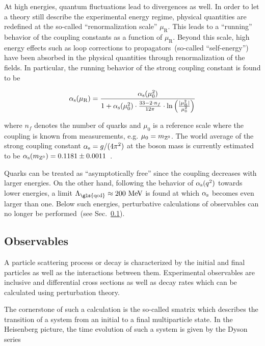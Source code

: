 
At high energies, quantum fluctuations lead to divergences as well. In order to let a theory still describe the experimental energy regime, physical quantities are redefined at the so-called ``renormalization scale'' $\mu_\mathrm{R}$. This leads to a ``running'' behavior of the coupling constants as a function of $\mu_\mathrm{R}$. Beyond this scale, high energy effects such as loop corrections to propagators~(so-called ``self-energy'') have been absorbed in the physical quantities through renormalization of the fields. In particular, the running behavior of the strong coupling constant is found to be 

\begin{equation}
{\alpha_\mathrm{s}}(\mu_\mathrm{R})=\frac{{\alpha_\mathrm{s}}(\mu_{0}^{2})}{1+{\alpha_\mathrm{s}}(\mu_\mathrm{0}^2)\cdot\tfrac{33-2\cdot n_f}{12\pi}\cdot\ln\Big(\tfrac{|\mu_\mathrm{R}^2|}{\mu_{0}^{2}}\Big)}
\end{equation}

where $n_f$ denotes the number of quarks and $\mu_{0}$ is a reference scale where the coupling is known from measurements, e.g. $\mu_{0}=m_{{\mathrm{Z}^{0}}}$. The world average of the strong coupling constant ${\alpha_\mathrm{s}}=g/(4\pi^2)$ at the \zboson boson mass is currently estimated to be ${\alpha_\mathrm{s}}(m_{{\mathrm{Z}^{0}}})=0.1181\pm0.0011$~\cite{Olive:2016xmw}. 

Quarks can be treated as ``asymptotically free'' since the coupling decreases with larger energies. On the other hand, following the behavior of ${\alpha_\mathrm{s}}(q^2)$ towards lower energies, a limit $\Lambda_\mathrm{\gls{qcd}}\approx 200~\MeV$ is found at which ${\alpha_\mathrm{s}}$ becomes even larger than one. Below such energies, perturbative calculations of observables can no longer be performed~(see Sec.~\ref{sec:theory-observables}). 



\subsection{Observables}
\label{sec:theory-observables}

A particle scattering process or decay is characterized by the initial and final particles as well as the interactions between them. Experimental observables are inclusive and differential cross sections as well as decay rates which can be calculated using perturbation theory. 

The cornerstone of such a calculation is the so-called \gls{smatrix} which describes the transition of a system from an initial to a final multiparticle state. In the Heisenberg picture, the time evolution of such a system is given by the Dyson series

